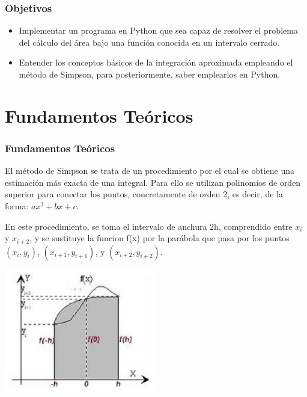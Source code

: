 \documentclass{beamer}
\begin{document}
\begin{frame}
\frametitle{Objetivos }

  \begin{itemize}
  \item
   Implementar un programa en Python que sea capaz de resolver el problema del cálculo del área bajo una función conocida en un 
   intervalo cerrado.
  \pause
  \item
   Entender los conceptos básicos de la integración aproximada empleando el método de Simpson, para posteriormente, saber emplearlos
   en Python.
  \end{itemize}
\end{frame}

\section{Fundamentos Teóricos}

\begin{frame}
\frametitle{Fundamentos Teóricos}
	El método de Simpson se trata de un procedimiento por el cual se obtiene una estimación más exacta de una integral. Para ello se 
utilizan polinomios de orden superior para conectar los puntos, concretamente de orden 2, es decir, de la forma: $ ax^2 + bx + c $.

	En este procedimiento, se toma el intervalo de anchura 2h, comprendido entre $x_{i}$ y $ x_{i+2} $, y se sustituye la funcion f(x) por la parábola que pasa por los puntos $ (x_{i},y_{i}) $, $ (x_{i+1},y_{i+1}) $, y $ (x_{i+2},y_{i+2}) $.

\begin{center}
\includegraphics[width=0.5\textwidth]{img/ima1.eps}
\end{center}	
	
\end{frame}
\end{document}
